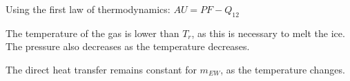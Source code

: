 Using the first law of thermodynamics: \( AU = PF - Q_{12} \)  

The temperature of the gas is lower than \( T_r \), as this is necessary to melt the ice. The pressure also decreases as the temperature decreases.  

The direct heat transfer remains constant for \( m_{EW} \), as the temperature changes.